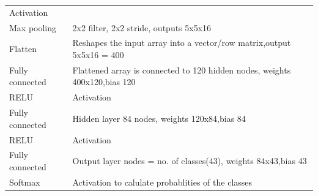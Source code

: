 \documentclass[11pt]{article}
\begin{document}
\begin{longtable}[]{@{}ll@{}}
\begin{minipage}[t]{0.61\columnwidth}
Activation\strut
\end{minipage}\tabularnewline
\begin{minipage}[t]{0.30\columnwidth}\raggedright\strut
Max pooling\strut
\end{minipage} & \begin{minipage}[t]{0.61\columnwidth}\raggedright\strut
2x2 filter, 2x2 stride, outputs 5x5x16\strut
\end{minipage}\tabularnewline
\begin{minipage}[t]{0.30\columnwidth}\raggedright\strut
Flatten\strut
\end{minipage} & \begin{minipage}[t]{0.61\columnwidth}\raggedright\strut
Reshapes the input array into a vector/row matrix,output 5x5x16 =
400\strut
\end{minipage}\tabularnewline
\begin{minipage}[t]{0.30\columnwidth}\raggedright\strut
Fully connected\strut
\end{minipage} & \begin{minipage}[t]{0.61\columnwidth}\raggedright\strut
Flattened array is connected to 120 hidden nodes, weights 400x120,bias
120\strut
\end{minipage}\tabularnewline
\begin{minipage}[t]{0.30\columnwidth}\raggedright\strut
RELU\strut
\end{minipage} & \begin{minipage}[t]{0.61\columnwidth}\raggedright\strut
Activation\strut
\end{minipage}\tabularnewline
\begin{minipage}[t]{0.30\columnwidth}\raggedright\strut
Fully connected\strut
\end{minipage} & \begin{minipage}[t]{0.61\columnwidth}\raggedright\strut
Hidden layer 84 nodes, weights 120x84,bias 84\strut
\end{minipage}\tabularnewline
\begin{minipage}[t]{0.30\columnwidth}\raggedright\strut
RELU\strut
\end{minipage} & \begin{minipage}[t]{0.61\columnwidth}\raggedright\strut
Activation\strut
\end{minipage}\tabularnewline
\begin{minipage}[t]{0.30\columnwidth}\raggedright\strut
Fully connected\strut
\end{minipage} & \begin{minipage}[t]{0.61\columnwidth}\raggedright\strut
Output layer nodes = no. of classes(43), weights 84x43,bias 43\strut
\end{minipage}\tabularnewline
\begin{minipage}[t]{0.30\columnwidth}\raggedright\strut
Softmax\strut
\end{minipage} & \begin{minipage}[t]{0.61\columnwidth}\raggedright\strut
Activation to calulate probablities of the classes\strut
\end{minipage}\tabularnewline
\bottomrule
\end{longtable}
\end{document}
